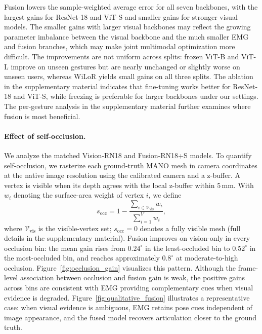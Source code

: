 \documentclass[letterpaper]{article} %
\newcommand{\degree}{^\circ}
\newcommand{\supplementref}[1]{%
  the supplementary material}
\begin{document}
Fusion lowers the sample-weighted average error for all seven backbones, with the largest gains for ResNet-18 and ViT-S and smaller gains for stronger visual models. The smaller gains with larger visual backbones may reflect the growing parameter imbalance between the visual backbone and the much smaller EMG and fusion branches, which may make joint multimodal optimization more difficult. The improvements are not uniform across splits: frozen ViT-B and ViT-L improve on unseen gestures but are nearly unchanged or slightly worse on unseen users, whereas WiLoR yields small gains on all three splits. The ablation in \supplementref{app:fusion_freeze_ablation} indicates that fine-tuning works better for ResNet-18 and ViT-S, while freezing is preferable for larger backbones under our settings. The per-gesture analysis in \supplementref{app:per_gesture} further examines where fusion is most beneficial.

\paragraph{Effect of self-occlusion.}
We analyze the matched Vision-RN18 and Fusion-RN18+S models. To quantify self-occlusion, we rasterize each ground-truth MANO mesh in camera coordinates at the native image resolution using the calibrated camera and a z-buffer. A vertex is visible when its depth agrees with the local z-buffer within 5\,mm. With $w_i$ denoting the surface-area weight of vertex $i$, we define
\begin{equation}
s_{\mathrm{occ}} = 1 - \frac{\sum_{i \in \mathcal{V}_{\mathrm{vis}}} w_i}
{\sum_{i=1}^{V} w_i},
\end{equation}
where $\mathcal{V}_{\mathrm{vis}}$ is the visible-vertex set; $s_{\mathrm{occ}}=0$ denotes a fully visible mesh (full details in \supplementref{app:occlusion}). Fusion improves on vision-only in every occlusion bin: the mean gain rises from $0.24\degree$ in the least-occluded bin to $0.52\degree$ in the most-occluded bin, and reaches approximately $0.8\degree$ at moderate-to-high occlusion. Figure~\ref{fig:occlusion_gain} visualizes this pattern. Although the frame-level association between occlusion and fusion gain is weak, the positive gains across bins are consistent with EMG providing complementary cues when visual evidence is degraded. Figure~\ref{fig:qualitative_fusion} illustrates a representative case: when visual evidence is ambiguous, EMG retains pose cues independent of image appearance, and the fused model recovers articulation closer to the ground truth.
\end{document}
